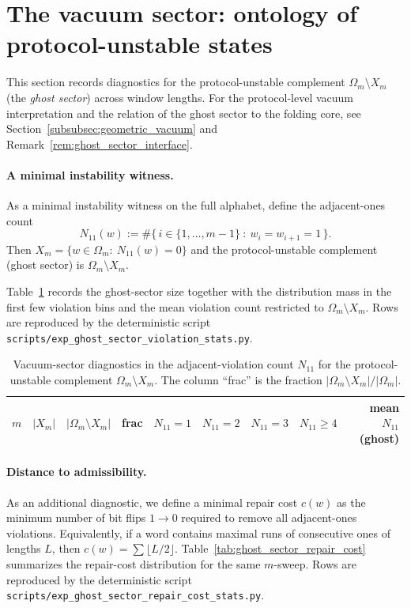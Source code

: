 \section[The vacuum sector]{The vacuum sector: ontology of protocol-unstable states}
\label{app:ghost_sector}

This section records diagnostics for the protocol-unstable complement $\Omega_m\setminus X_m$ (the \emph{ghost sector}) across window lengths.
For the protocol-level vacuum interpretation and the relation of the ghost sector to the folding core, see Section~\ref{subsubsec:geometric_vacuum} and Remark~\ref{rem:ghost_sector_interface}.

\paragraph{A minimal instability witness.}
As a minimal instability witness on the full alphabet, define the adjacent-ones count
\[
N_{11}(w):=\#\{\,i\in\{1,\dots,m-1\}\ :\ w_i=w_{i+1}=1\,\}.
\]
Then $X_m=\{w\in\Omega_m:\ N_{11}(w)=0\}$ and the protocol-unstable complement (ghost sector) is $\Omega_m\setminus X_m$.

Table~\ref{tab:ghost_sector_violations} records the ghost-sector size together with the distribution mass in the first few violation bins and the mean violation count restricted to $\Omega_m\setminus X_m$.
Rows are reproduced by the deterministic script \texttt{scripts/exp\_ghost\_sector\_violation\_stats.py}.

\begin{table}[H]
\centering
\scriptsize
\setlength{\tabcolsep}{6pt}
\renewcommand{\arraystretch}{1.15}
\begin{tabular}{rrrrrrrrr}
\toprule
$m$ & $|X_m|$ & $|\Omega_m\setminus X_m|$ & frac &
$N_{11}=1$ & $N_{11}=2$ & $N_{11}=3$ & $N_{11}\ge 4$ & mean $N_{11}$ (ghost) \\
\midrule
%
\end{tabular}
\caption{Vacuum-sector diagnostics in the adjacent-violation count $N_{11}$ for the protocol-unstable complement $\Omega_m\setminus X_m$. The column ``frac'' is the fraction $|\Omega_m\setminus X_m|/|\Omega_m|$.}
\label{tab:ghost_sector_violations}
\end{table}

\paragraph{Distance to admissibility.}
As an additional diagnostic, we define a minimal repair cost $c(w)$ as the minimum number of bit flips $1\to 0$ required to remove all adjacent-ones violations.
Equivalently, if a word contains maximal runs of consecutive ones of lengths $L$, then $c(w)=\sum \lfloor L/2\rfloor$.
Table~\ref{tab:ghost_sector_repair_cost} summarizes the repair-cost distribution for the same $m$-sweep.
Rows are reproduced by the deterministic script \texttt{scripts/exp\_ghost\_sector\_repair\_cost\_stats.py}.

